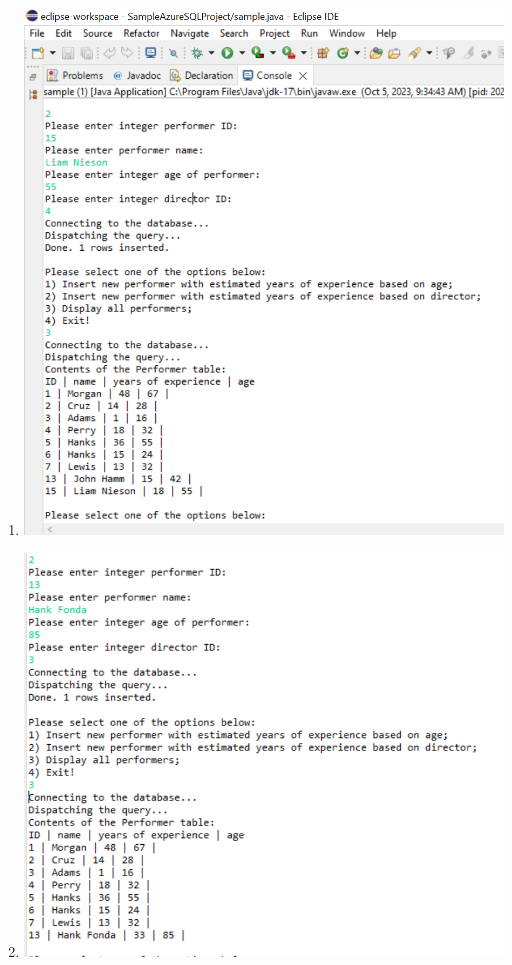 \documentclass[11pt]{article}
\begin{document}
\begin{enumerate}
\item \includegraphics[width = \textwidth]{Insert2.png}
\item \includegraphics[width = \textwidth]{Insert2.1.png} 

\end{enumerate}
\end{document}
